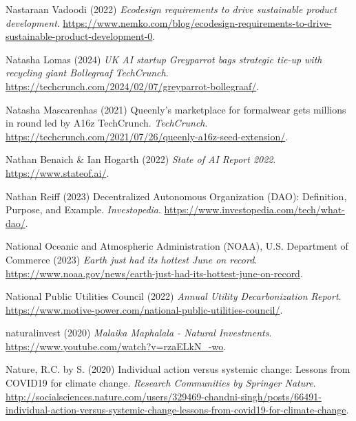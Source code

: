 \documentclass[
  letterpaper,
  DIV=11,
  numbers=noendperiod]{scrartcl}
\newlength{\cslhangindent}
\newenvironment{CSLReferences}[2] %
 {\begin{list}{}{%
  \setlength{\itemindent}{0pt}
  \setlength{\leftmargin}{0pt}
  \setlength{\parsep}{0pt}
  \ifodd #1
   \setlength{\leftmargin}{\cslhangindent}
   \setlength{\itemindent}{-1\cslhangindent}
  \fi
  \setlength{\itemsep}{#2\baselineskip}}}
 {\end{list}}
\begin{document}
\begin{CSLReferences}{0}{1}
Nastaraan Vadoodi (2022) \emph{Ecodesign requirements to drive
sustainable product development}.
\url{https://www.nemko.com/blog/ecodesign-requirements-to-drive-sustainable-product-development-0}.

Natasha Lomas (2024) \emph{{UK AI} startup {Greyparrot} bags strategic
tie-up with recycling giant {Bollegraaf} {\textbar} {TechCrunch}}.
\url{https://techcrunch.com/2024/02/07/greyparrot-bollegraaf/}.

Natasha Mascarenhas (2021) Queenly's marketplace for formalwear gets
millions in round led by {A16z} {\textbar} {TechCrunch}.
\emph{TechCrunch}.
\url{https://techcrunch.com/2021/07/26/queenly-a16z-seed-extension/}.

Nathan Benaich \& Ian Hogarth (2022) \emph{State of {AI Report} 2022}.
\url{https://www.stateof.ai/}.

Nathan Reiff (2023) Decentralized {Autonomous Organization} ({DAO}):
{Definition}, {Purpose}, and {Example}. \emph{Investopedia}.
\url{https://www.investopedia.com/tech/what-dao/}.

National Oceanic and Atmospheric Administration (NOAA), U.S. Department
of Commerce (2023) \emph{Earth just had its hottest {June} on record}.
\url{https://www.noaa.gov/news/earth-just-had-its-hottest-june-on-record}.

National Public Utilities Council (2022) \emph{Annual {Utility
Decarbonization Report}}.
\url{https://www.motive-power.com/national-public-utilities-council/}.

naturalinvest (2020) \emph{Malaika {Maphalala} - {Natural Investments}}.
\url{https://www.youtube.com/watch?v=rzaELkN_-wo}.

Nature, R.C. by S. (2020) Individual action versus systemic change:
Lessons from {COVID19} for climate change. \emph{Research Communities by
Springer Nature}.
\url{http://socialsciences.nature.com/users/329469-chandni-singh/posts/66491-individual-action-versus-systemic-change-lessons-from-covid19-for-climate-change}.


\end{CSLReferences}
\end{document}
